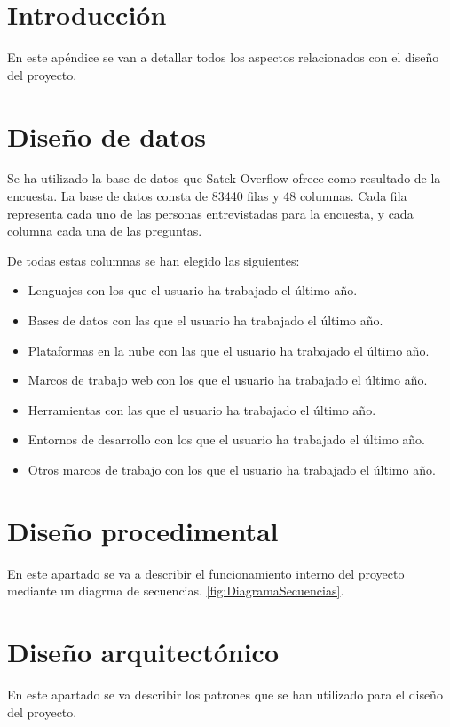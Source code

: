
\section{Introducción}
En este apéndice se van a detallar todos los aspectos relacionados con el diseño del proyecto.

\section{Diseño de datos}
Se ha utilizado la base de datos que Satck Overflow ofrece como resultado de la encuesta. La base de datos consta de 83440 filas y 48 columnas. Cada fila representa cada uno de las personas entrevistadas para la encuesta, y cada columna cada una de las preguntas.

De todas estas columnas se han elegido las siguientes:
\begin{itemize}
    \item Lenguajes con los que el usuario ha trabajado el último año.
    \item Bases de datos con las que el usuario ha trabajado el último año.
    \item Plataformas en la nube con las que el usuario ha trabajado el último año.
    \item Marcos de trabajo web con los que el usuario ha trabajado el último año.
    \item Herramientas con las que el usuario ha trabajado el último año.
    \item Entornos de desarrollo con los que el usuario ha trabajado el último año.
    \item Otros marcos de trabajo con los que el usuario ha trabajado el último año.
\end{itemize}


\section{Diseño procedimental}
En este apartado se va a describir el funcionamiento interno del proyecto mediante un diagrma de secuencias. \ref{fig:DiagramaSecuencias}.



\section{Diseño arquitectónico}
En este apartado se va describir los patrones que se han utilizado para el diseño del proyecto. \cite{wiki:patrones}

